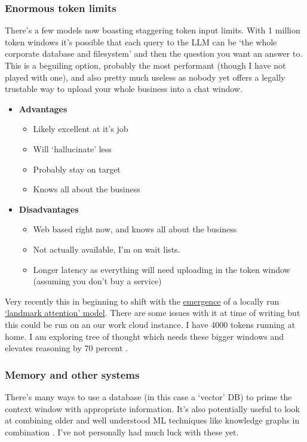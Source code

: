 \subsubsection{Enormous token limits}
\label{sec:llmoptions}
There's a few models now boasting staggering token input limits. With 1 million token windows it's possible that each query to the LLM can be `the whole corporate database and filesystem' and then the question you want an answer to. This is a beguiling option, probably the most performant (though I have not played with one), and also pretty much useless as nobody yet offers a legally trustable way to upload your whole business into a chat window.
\begin{itemize}
\item \textbf{Advantages}
\begin{itemize}
\item Likely excellent at it's job
\item Will `hallucinate' less
\item Probably stay on target
\item Knows all about the business
\end{itemize}
\item \textbf{Disadvantages}
\begin{itemize}
\item Web based right now, and knows all about the business
\item Not actually available, I'm on wait lists. 
\item Longer latency as everything will need uploading in the token window (assuming you don't buy a service)
\end{itemize}
\end{itemize}
Very recently this in beginning to shift with the \href{https://github.com/eugenepentland/landmark-attention-qlora}{emergence} of a locally run \href{}{`landmark attention' model}. There are some issues with it at time of writing but this could be run on an our work cloud instance. I have 4000 tokens running at home. I am exploring tree of thought which needs these bigger windows and elevates reasoning by 70 percent \cite{yao2023tree}.
\subsubsection{Memory and other systems}
There's many ways to use a database (in this case a `vector' DB) to prime the context window with appropriate information. It's also potentially useful to look at combining older and well understood ML techniques like knowledge graphs in combination \cite{pan2023unifying}. I've not personally had much luck with these yet.
